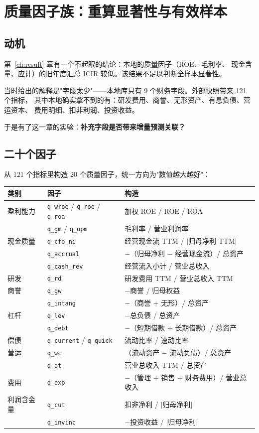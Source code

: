 \chapter{质量因子族：重算显著性与有效样本}\label{app:quality}

\section{动机}

第~\ref{ch:result} 章有一个不起眼的结论：本地的质量因子（ROE、毛利率、
现金含量、应计）的旧年度汇总 ICIR 较低。该结果不足以判断全样本显著性。

当时给出的解释是"字段太少"——本地库只有 9 个财务字段。外部快照带来 121 个指标，
其中本地确实拿不到的有：研发费用、商誉、无形资产、有息负债、营运资本、
费用明细、扣非利润、投资收益。

于是有了这一章的实验：\textbf{补充字段是否带来增量预测关联？}

\section{二十个因子}

从 121 个指标里构造 20 个质量因子，统一方向为"数值越大越好"：

\begin{center}
\small
\begin{tabular}{@{}lll@{}}
\toprule
类别 & 因子 & 构造 \\
\midrule
盈利能力 & \texttt{q\_wroe} / \texttt{q\_roe} / \texttt{q\_roa} & 加权 ROE / ROE / ROA \\
 & \texttt{q\_gm} / \texttt{q\_opm} & 毛利率 / 营业利润率 \\
现金质量 & \texttt{q\_cfo\_ni} & 经营现金流 TTM / $|$归母净利 TTM$|$ \\
 & \texttt{q\_accrual} & $-$（归母净利 $-$ 经营现金流）/ 总资产 \\
 & \texttt{q\_cash\_rev} & 经营流入小计 / 营业总收入 \\
研发 & \texttt{q\_rd} & 研发费用 TTM / 营业总收入 TTM \\
商誉 & \texttt{q\_gw} & $-$商誉 / 归母权益 \\
 & \texttt{q\_intang} & $-$（商誉 $+$ 无形）/ 总资产 \\
杠杆 & \texttt{q\_lev} & $-$总负债 / 总资产 \\
 & \texttt{q\_debt} & $-$（短期借款 $+$ 长期借款）/ 总资产 \\
偿债 & \texttt{q\_current} / \texttt{q\_quick} & 流动比率 / 速动比率 \\
营运 & \texttt{q\_wc} & （流动资产 $-$ 流动负债）/ 总资产 \\
 & \texttt{q\_at} & 营业总收入 TTM / 总资产 \\
费用 & \texttt{q\_exp} & $-$（管理 $+$ 销售 $+$ 财务费用）/ 营业总收入 \\
利润含金量 & \texttt{q\_cut} & 扣非净利 / $|$归母净利$|$ \\
 & \texttt{q\_invinc} & $-$投资收益 / $|$归母净利$|$ \\
\bottomrule
\end{tabular}
\end{center}

